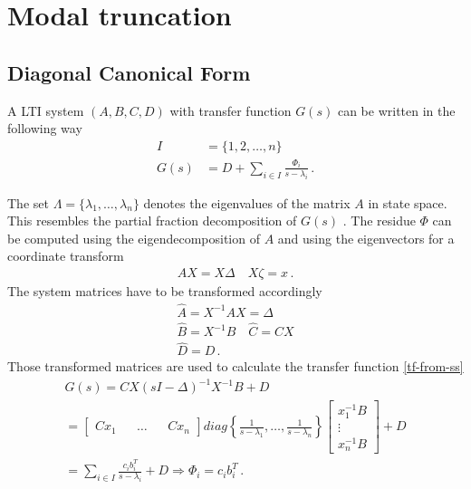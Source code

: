 \section{Modal truncation}
\subsection{Diagonal Canonical Form} \label{dcnf}
A LTI system \((A, B, C, D)\) with transfer function \(G(s)\) can be written in the following way
\begin{align}
I &= \{1, 2, \hdots, n\} \\
G(s) &= D + \sum_{i \in I} \frac{\Phi_i}{s-\lambda_i} \,. \label{dcnf}
\end{align}

The set \(\Lambda = \{\lambda_1, \hdots, \lambda_n\}\) denotes the eigenvalues of the matrix \(A\) in state space.
This resembles the partial fraction decomposition of \(G(s)\) \cite{vuillemin2020optimal}.
The residue \(\Phi\) can be computed using the eigendecomposition of \(A\) and using the eigenvectors for a coordinate transform
\begin{gather}
AX = X\Delta \quad X \zeta =  x  \,.
\end{gather}
The system matrices have to be transformed accordingly
\begin{gather}
\hat{A} = X^{-1}AX = \Delta \\
\hat{B} = X^{-1}B \quad \hat{C} = CX \\
\hat{D} = D \,.
\end{gather}
Those transformed matrices are used to calculate the transfer function \ref{tf-from-ss}
\begin{gather}
G(s) = CX(sI - \Delta)^{-1}X^{-1}B + D\\
= \begin{bmatrix}
C x_1 && \hdots && Cx_n
\end{bmatrix} diag\left\{\frac{1}{s-\lambda_1}, \hdots, \frac{1}{s-\lambda_n}\right\} \begin{bmatrix}
x_1^{-1}B \\
\vdots \\
x_n^{-1}B
\end{bmatrix} + D \\
= \sum_{i \in I} \frac{c_i b_i^{T}}{s - \lambda_i}  + D
\Rightarrow \Phi_i = c_i b_i^{T} \,.
\end{gather}
\cite{Benner}

